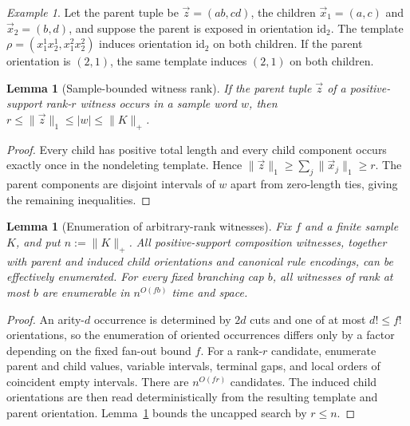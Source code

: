 \documentclass[11pt,a4paper]{article}
\numberwithin{equation}{section}
\theoremstyle{plain}
\newtheorem{lemma}[theorem]{Lemma}
\theoremstyle{definition}
\theoremstyle{remark}
\newtheorem{example}[theorem]{Example}
\newcommand{\tuple}[1]{\vec{#1}}
\begin{document}
\begin{example}
Let the parent tuple be \(\tuple z=(ab,cd)\), the children
\(\tuple x_1=(a,c)\) and \(\tuple x_2=(b,d)\), and suppose the parent is
exposed in orientation \(\mathrm{id}_2\).  The template
\(\rho=(x_1^1x_2^1,x_1^2x_2^2)\) induces orientation \(\mathrm{id}_2\) on both
children.  If the parent orientation is \((2,1)\), the same template induces
\((2,1)\) on both children.
\end{example}

\begin{lemma}[Sample-bounded witness rank]
\label{lem:sample-bounded-rank}
If the parent tuple \(\tuple z\) of a positive-support rank-\(r\) witness
occurs in a sample word \(w\), then
\(r\le\|\tuple z\|_1\le|w|\le\|K\|_+\).
\end{lemma}

\begin{proof}
Every child has positive total length and every child component occurs exactly
once in the nondeleting template.  Hence
\(\|\tuple z\|_1\ge\sum_j\|\tuple x_j\|_1\ge r\).  The parent components are
disjoint intervals of \(w\) apart from zero-length ties, giving the remaining
inequalities.
\end{proof}

\begin{lemma}[Enumeration of arbitrary-rank witnesses]
\label{lem:general-witness-enumeration}
Fix \(f\) and a finite sample \(K\), and put \(n:=\|K\|_+\).  All
positive-support composition witnesses, together with parent and induced child
orientations and canonical rule encodings, can be effectively enumerated.  For
every fixed branching cap \(b\), all witnesses of rank at most \(b\) are
enumerable in \(n^{O(fb)}\) time and space.
\end{lemma}

\begin{proof}
An arity-\(d\) occurrence is determined by \(2d\) cuts and one of at most
\(d!\le f!\) orientations, so the enumeration of oriented occurrences differs
only by a factor depending on the fixed fan-out bound \(f\).  For a rank-\(r\)
candidate,
enumerate parent and child values, variable intervals, terminal gaps, and local
orders of coincident empty intervals.  There are \(n^{O(fr)}\) candidates.
The induced child orientations are then read deterministically from the
resulting template and parent orientation.  Lemma~\ref{lem:sample-bounded-rank}
bounds the uncapped search by \(r\le n\).
\end{proof}
\end{document}
